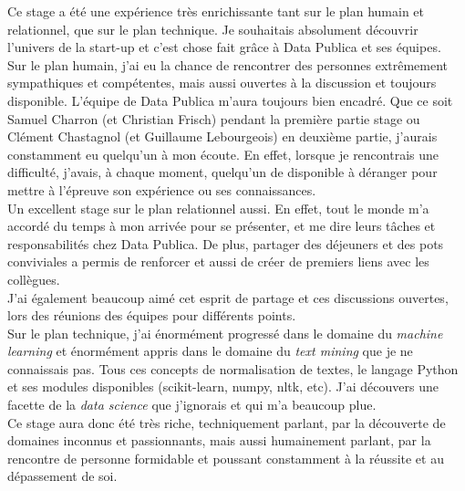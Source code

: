 Ce stage a été une expérience très enrichissante tant sur le plan humain et relationnel, que sur le plan technique. Je souhaitais absolument découvrir l'univers de la start-up et c'est chose fait grâce à Data Publica et ses équipes.\\

Sur le plan humain, j'ai eu la chance de rencontrer des personnes extrêmement sympathiques et compétentes, mais aussi ouvertes à la discussion et toujours disponible. L'équipe de Data Publica m'aura toujours bien encadré. Que ce soit Samuel Charron (et Christian Frisch) pendant la première partie stage ou Clément Chastagnol (et Guillaume Lebourgeois) en deuxième partie, j'aurais constamment eu quelqu'un à mon écoute. En effet, lorsque je rencontrais une difficulté, j'avais, à chaque moment, quelqu'un de disponible à \og déranger \fg pour mettre à l'épreuve son expérience ou ses connaissances.\\

Un excellent stage sur le plan relationnel aussi. En effet, tout le monde m'a accordé du temps à mon arrivée pour se présenter, et me dire leurs tâches et responsabilités chez Data Publica. De plus, partager des déjeuners et des pots conviviales a permis de renforcer et aussi de créer de premiers liens avec les collègues.\\

J'ai également beaucoup aimé cet esprit de partage et ces discussions ouvertes, lors des réunions des équipes pour différents points.\\

Sur le plan technique, j'ai énormément progressé dans le domaine du \textit{machine learning} et énormément appris dans le domaine du \textit{text mining} que je ne connaissais pas. Tous ces concepts de normalisation de textes, le langage Python et ses modules disponibles (scikit-learn, numpy, nltk, etc). J'ai découvers une facette de la \textit{data science} que j'ignorais et qui m'a beaucoup plue.\\

Ce stage aura donc été très riche, techniquement parlant, par la découverte de domaines inconnus et passionnants, mais aussi humainement parlant, par la rencontre de personne formidable et poussant constamment à la réussite et au dépassement de soi.

